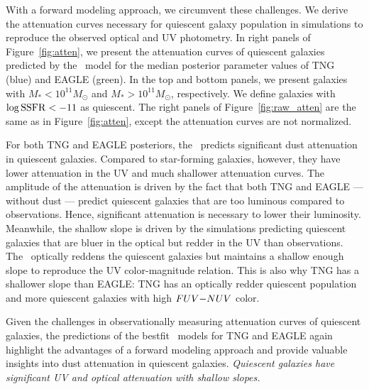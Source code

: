 With a forward modeling approach, we circumvent these challenges. We derive the 
attenuation curves necessary for quiescent galaxy population in simulations to
reproduce the observed optical and UV photometry.  In right panels of
Figure~\ref{fig:atten}, we present the attenuation curves of quiescent galaxies 
predicted by the \eda~model for the median posterior parameter values of TNG (blue) 
and EAGLE (green). In the top and bottom panels, we present galaxies with 
$M_* < 10^{11} M_\odot$ and $M_* > 10^{11} M_\odot$, respectively. 
We define galaxies with $\log {\rm SSFR} < -11$ as quiescent. The right panels 
of Figure~\ref{fig:raw_atten} are the same as in Figure~\ref{fig:atten}, except
the attenuation curves are not normalized. 

For both TNG and EAGLE posteriors, the \eda~predicts significant dust attenuation 
in quiescent galaxies. Compared to star-forming galaxies, however, they have 
lower attenuation in the UV and much shallower attenuation curves. The amplitude 
of the attenuation is driven by the fact that both TNG and EAGLE --- without dust --- predict quiescent galaxies that are too 
luminous compared to observations. Hence, significant attenuation is necessary 
to lower their luminosity. Meanwhile, the shallow slope is driven by the
simulations predicting quiescent galaxies that are bluer in the optical but
redder in the UV than observations. The \eda~optically reddens the quiescent
galaxies but maintains a shallow enough slope to reproduce the UV
color-magnitude relation. This is also why TNG has a shallower slope than
EAGLE: TNG has an optically redder quiescent population and more quiescent
galaxies with high $FUV{-}NUV$ color. 

Given the challenges in observationally measuring attenuation curves of quiescent
galaxies, the predictions of the bestfit \eda~models for TNG and EAGLE again 
highlight the advantages of a forward modeling approach and provide valuable 
insights into dust attenuation in quiescent galaxies. \emph{Quiescent galaxies
have significant UV and optical attenuation with shallow slopes.} 

